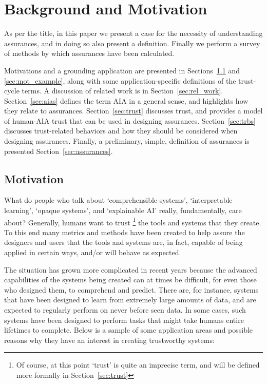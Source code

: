 \section{Background and Motivation} \label{sec:background}
As per the title, in this paper we present a case for the necessity of understanding assurances, and in doing so also present a definition. Finally we perform a survey of methods by which assurances have been calculated.

Motivations and a grounding application are presented in Sections~\ref{sec:motivation} and \ref{sec:mot_example}, along with some application-specific definitions of the trust-cycle terms. A discussion of related work is in Section~\ref{sec:rel_work}. Section~\ref{sec:aias} defines the term AIA in a general sense, and highlights how they relate to assurances. Section~\ref{sec:trust} discusses trust, and provides a model of human-AIA trust that can be used in designing assurances. Section~\ref{sec:trbs} discusses trust-related behaviors and how they should be considered when designing assurances. Finally, a preliminary, simple, definition of assurances is presented Section~\ref{sec:assurances}. 

\subsection{Motivation} \label{sec:motivation}
    What do people who talk about `comprehensible systems', `interpretable learning', `opaque systems', and `explainable AI' really, fundamentally, care about? Generally, humans want to trust \footnote{Of course, at this point `trust' is quite an imprecise term, and will be defined more formally in Section~\ref{sec:trust}} the tools and systems that they create. To this end many metrics and methods have been created to help assure the designers and users that the tools and systems are, in fact, capable of being applied in certain ways, and/or will behave as expected. 

    The situation has grown more complicated in recent years because the advanced capabilities of the systems being created can at times be difficult, for even those who designed them, to comprehend and predict. There are, for instance, systems that have been designed to learn from extremely large amounts of data, and are expected to regularly perform on never before seen data. In some cases, such systems have been designed to perform tasks that might take humans entire lifetimes to complete. Below is a sample of some application areas and possible reasons why they have an interest in creating trustworthy systems:

